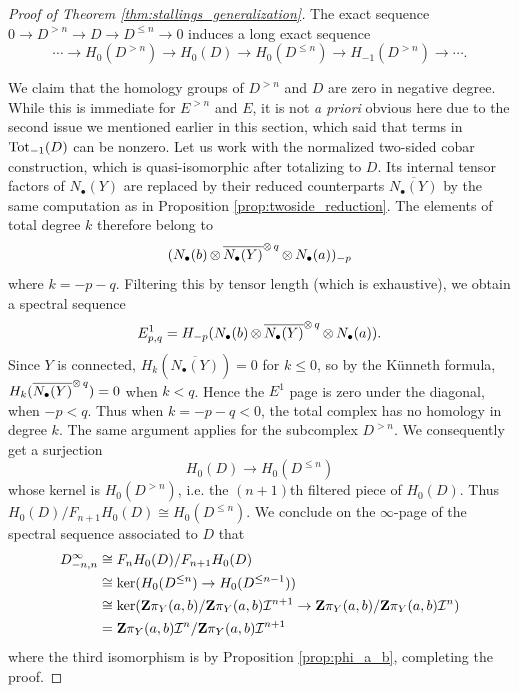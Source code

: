 \begin{proof}[Proof of Theorem \ref{thm:stallings_generalization}]
   The exact sequence $0 \to D^{>n} \to D \to D^{\leq n} \to 0$ induces a long exact sequence 
\[\cdots \to H_0( D^{>n}) \to H_0(D) \to H_0(D^{\leq n}) \to H_{-1}(D^{>n})\to \cdots.\]

We claim that the homology groups of $D^{>n}$ and $D$ are zero in negative degree. While this is immediate for $E^{>n}$ and $E$, it is not \emph{a priori} obvious here due to the second issue we mentioned earlier in this section, which said that terms in $\operatorname{Tot}_{-1}(D)$ can be nonzero. Let us work with the normalized two-sided cobar construction, which is quasi-isomorphic after totalizing to $D$. Its internal tensor factors of $N_\bullet(Y)$ are replaced by their reduced counterparts $\overline{N_\bullet(Y)}$ by the same computation as in Proposition \ref{prop:twoside_reduction}. The elements of total degree $k$ therefore belong to
\[(N_\bullet(b) \operatorname{\otimes} \overline{N_\bullet(Y)}^{\operatorname{\otimes} q} \operatorname{\otimes} N_\bullet(a))_{-p}\]
where $k=-p-q$. Filtering this by tensor length (which is exhaustive), we obtain a spectral sequence 
\[E^{1}_{p,q} = H_{-p}(N_\bullet(b)\operatorname{\otimes} \overline{N_\bullet(Y)}^{\operatorname{\otimes} q} \operatorname{\otimes} N_\bullet(a)).\]
Since $Y$ is connected, $H_{k}(\overline{N_\bullet(Y)}) = 0$ for $k \leq 0$, so by the K{\"u}nneth formula, $H_{k}(\overline{N_\bullet(Y)}^{\operatorname{\otimes} q}) = 0$ when $k<q$. Hence the $E^1$ page is zero under the diagonal, when $-p<q$. Thus when $k=-p-q<0$, the total complex has no homology in degree $k$. The same argument applies for the subcomplex $D^{>n}$. We consequently get a surjection 
\[H_0(D)\to H_0(D^{\leq n})\]
whose kernel is $H_0(D^{>n})$, i.e. the $(n+1)$th filtered piece of $H_0(D)$. Thus $H_0(D) / F_{n+1}H_0(D) \cong H_0(D^{\leq n})$. We conclude on the $\infty$-page of the spectral sequence associated to $D$ that
\begin{equation*}
\begin{split}
D^{\infty}_{-n,n} &\cong F_nH_0(D) / F_{n+1}H_0(D) \\
&\cong \ker(H_0(D^{\leq n}) \to H_0(D^{\leq n-1})) \\
&\cong \ker(\mathbf{Z}\pi_Y(a,b)/\mathbf{Z}\pi_Y(a,b)\mathcal{I}^{n+1} \to \mathbf{Z}\pi_Y(a,b)/\mathbf{Z}\pi_Y(a,b)\mathcal{I}^{n}) \\
&=\mathbf{Z}\pi_Y(a,b)\mathcal{I}^{n} / \mathbf{Z}\pi_Y(a,b)\mathcal{I}^{n+1}
\end{split}
\end{equation*}
where the third isomorphism is by Proposition \ref{prop:phi_a_b}, completing the proof.
\end{proof}
